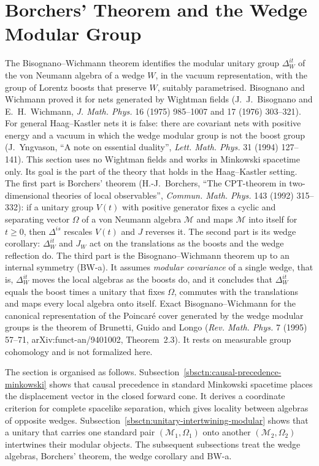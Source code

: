 \section{Borchers' Theorem and the Wedge Modular Group}\label{sctn:borchers-wedges}

The Bisognano--Wichmann theorem identifies the modular unitary group $\Delta_W^{it}$ of the von Neumann algebra of a wedge $W$, in the vacuum representation, with the group of Lorentz boosts that preserve $W$, suitably parametrised. Bisognano and Wichmann proved it for nets generated by Wightman fields (J.~J.~Bisognano and E.~H.~Wichmann, \emph{J. Math. Phys.} 16 (1975) 985--1007 and 17 (1976) 303--321). For general Haag--Kastler nets it is false: there are covariant nets with positive energy and a vacuum in which the wedge modular group is not the boost group (J.~Yngvason, ``A note on essential duality'', \emph{Lett. Math. Phys.} 31 (1994) 127--141). This section uses no Wightman fields and works in Minkowski spacetime only. Its goal is the part of the theory that holds in the Haag--Kastler setting. The first part is Borchers' theorem (H.-J.~Borchers, ``The CPT-theorem in two-dimensional theories of local observables'', \emph{Commun. Math. Phys.} 143 (1992) 315--332): if a unitary group $V(t)$ with positive generator fixes a cyclic and separating vector $\Omega$ of a von Neumann algebra $\mathcal{M}$ and maps $\mathcal{M}$ into itself for $t \ge 0$, then $\Delta^{is}$ rescales $V(t)$ and $J$ reverses it. The second part is its wedge corollary: $\Delta_W^{it}$ and $J_W$ act on the translations as the boosts and the wedge reflection do. The third part is the Bisognano--Wichmann theorem up to an internal symmetry (BW-a). It assumes \emph{modular covariance} of a single wedge, that is, $\Delta_W^{it}$ moves the local algebras as the boosts do, and it concludes that $\Delta_W^{it}$ equals the boost times a unitary that fixes $\Omega$, commutes with the translations and maps every local algebra onto itself. Exact Bisognano--Wichmann for the canonical representation of the Poincar\'e cover generated by the wedge modular groups is the theorem of Brunetti, Guido and Longo (\emph{Rev. Math. Phys.} 7 (1995) 57--71, arXiv:funct-an/9401002, Theorem~2.3). It rests on measurable group cohomology and is not formalized here.

The section is organised as follows. Subsection~\ref{sbsctn:causal-precedence-minkowski} shows that causal precedence in standard Minkowski spacetime places the displacement vector in the closed forward cone. It derives a coordinate criterion for complete spacelike separation, which gives locality between algebras of opposite wedges. Subsection~\ref{sbsctn:unitary-intertwining-modular} shows that a unitary that carries one standard pair $(\mathcal{M}_1, \Omega_1)$ onto another $(\mathcal{M}_2, \Omega_2)$ intertwines their modular objects. The subsequent subsections treat the wedge algebras, Borchers' theorem, the wedge corollary and BW-a.


